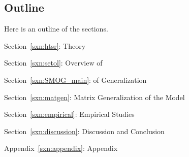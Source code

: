 
\subsection{Outline}

Here is an outline of the sections.

Section~\ref{sxn:htsr}: \HeavyTailedSelfRegularization Theory

Section~\ref{sxn:setol}: Overview of \SETOL %

Section~\ref{sxn:SMOG_main}: \StatisticalMechanics of Generalization


Section~\ref{sxn:matgen}: Matrix Generalization of the \StudentTeacher Model

Section~\ref{sxn:empirical}: Empirical Studies

Section~\ref{sxn:discussion}: Discussion and Conclusion

Appendix~\ref{sxn:appendix}: Appendix



